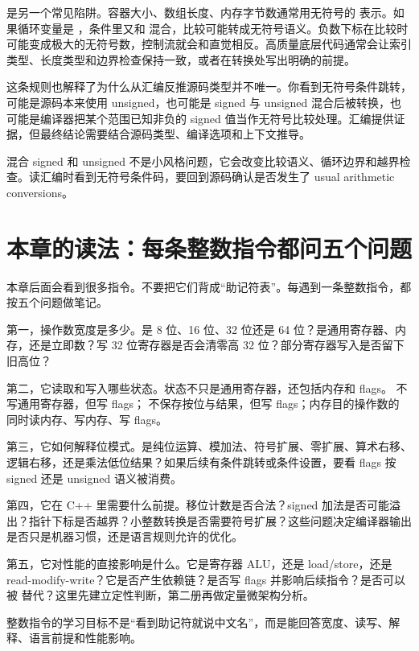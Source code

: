  是另一个常见陷阱。容器大小、数组长度、内存字节数通常用无符号的  表示。如果循环变量是 ，条件里又和  混合，比较可能转成无符号语义。负数下标在比较时可能变成极大的无符号数，控制流就会和直觉相反。高质量底层代码通常会让索引类型、长度类型和边界检查保持一致，或者在转换处写出明确的前提。

这条规则也解释了为什么从汇编反推源码类型并不唯一。你看到无符号条件跳转，可能是源码本来使用 unsigned，也可能是 signed 与 unsigned 混合后被转换，也可能是编译器把某个范围已知非负的 signed 值当作无符号比较处理。汇编提供证据，但最终结论需要结合源码类型、编译选项和上下文推导。

\begin{warningbox}
混合 signed 和 unsigned 不是小风格问题，它会改变比较语义、循环边界和越界检查。读汇编时看到无符号条件码，要回到源码确认是否发生了 usual arithmetic conversions。
\end{warningbox}

\section{本章的读法：每条整数指令都问五个问题}

本章后面会看到很多指令。不要把它们背成“助记符表”。每遇到一条整数指令，都按五个问题做笔记。

第一，操作数宽度是多少。是 8 位、16 位、32 位还是 64 位？是通用寄存器、内存，还是立即数？写 32 位寄存器是否会清零高 32 位？部分寄存器写入是否留下旧高位？

第二，它读取和写入哪些状态。状态不只是通用寄存器，还包括内存和 flags。 不写通用寄存器，但写 flags； 不保存按位与结果，但写 flags；内存目的操作数的  同时读内存、写内存、写 flags。

第三，它如何解释位模式。是纯位运算、模加法、符号扩展、零扩展、算术右移、逻辑右移，还是乘法低位结果？如果后续有条件跳转或条件设置，要看 flags 按 signed 还是 unsigned 语义被消费。

第四，它在 C++ 里需要什么前提。移位计数是否合法？signed 加法是否可能溢出？指针下标是否越界？小整数转换是否需要符号扩展？这些问题决定编译器输出是否只是机器习惯，还是语言规则允许的优化。

第五，它对性能的直接影响是什么。它是寄存器 ALU，还是 load/store，还是 read-modify-write？它是否产生依赖链？是否写 flags 并影响后续指令？是否可以被  替代？这里先建立定性判断，第二册再做定量微架构分析。

\begin{mentalmodel}
整数指令的学习目标不是“看到助记符就说中文名”，而是能回答宽度、读写、解释、语言前提和性能影响。
\end{mentalmodel}

